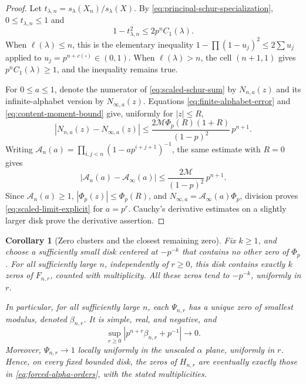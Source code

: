 \documentclass[11pt]{article}
\numberwithin{equation}{section}
\newtheorem{corollary}[corollary]{Corollary}
\theoremstyle{definition}
\theoremstyle{remark}
\begin{document}
\begin{proof}
Let $t_{\lambda,n}=s_\lambda(X_n)/s_\lambda(X)$. By
\eqref{eq:principal-schur-specialization}, $0\le t_{\lambda,n}\le1$ and
\begin{equation}\label{eq:finite-alphabet-error}
 1-t_{\lambda,n}^2\le 2p^n C_1(\lambda).
\end{equation}
When $\ell(\lambda)\le n$, this is the elementary inequality
$1-\prod(1-u_j)^2\le2\sum u_j$ applied to
$u_j=p^{n+c(\square)}\in(0,1)$. When $\ell(\lambda)>n$, the cell
$(n+1,1)$ gives $p^n C_1(\lambda)\ge1$, and the inequality remains true.

For $0\le a\le1$, denote the numerator of
\eqref{eq:scaled-schur-sum} by $N_{n,a}(z)$ and its infinite-alphabet
version by $N_{\infty,a}(z)$. Equations
\eqref{eq:finite-alphabet-error} and \eqref{eq:content-moment-bound}
give, uniformly for $|z|\le R$,
\[
 |N_{n,a}(z)-N_{\infty,a}(z)|
 \le \frac{2\mathcal M\Phi_p(R)(1+R)}{(1-p)^2}\,p^{n+1}.
\]
Writing $\mathcal A_n(a)=\prod_{i,j<n}(1-ap^{i+j+1})^{-1}$, the
same estimate with $R=0$ gives
\[
 |\mathcal A_n(a)-\mathcal A_\infty(a)|
 \le \frac{2\mathcal M}{(1-p)^2}\,p^{n+1}.
\]
Since $\mathcal A_n(a)\ge1$, $|\Phi_p(z)|\le\Phi_p(R)$, and
$N_{\infty,a}=\mathcal A_\infty(a)\Phi_p$, division proves
\eqref{eq:scaled-limit-explicit} for $a=p^r$. Cauchy's derivative
estimates on a slightly larger disk prove the derivative assertion.
\end{proof}

\begin{corollary}[Zero clusters and the closest remaining zero]
\label{cor:zero-clusters}
Fix $k\ge1$, and choose a sufficiently small disk centered at $-p^{-k}$
that contains no other zero of $\Phi_p$. For all sufficiently large $n$,
independently of $r\ge0$, this disk contains exactly $k$ zeros of
$F_{n,r}$, counted with multiplicity. All these zeros tend to $-p^{-k}$,
uniformly in $r$.

In particular, for all sufficiently large $n$, each $\Psi_{n,r}$ has
a unique zero of smallest modulus, denoted $\beta_{n,r}$. It is simple,
real, and negative, and
\begin{equation}\label{eq:closest-zero-leading}
 \sup_{r\ge0}|p^{n+r}\beta_{n,r}+p^{-1}|\longrightarrow0.
\end{equation}
Moreover, $\Psi_{n,r}\to1$ locally uniformly in the unscaled $\alpha$
plane, uniformly in $r$. Hence, on every fixed bounded disk, the zeros
of $H_{n,r}$ are eventually exactly those in
\eqref{eq:forced-alpha-orders}, with the stated multiplicities.
\end{corollary}
\end{document}
